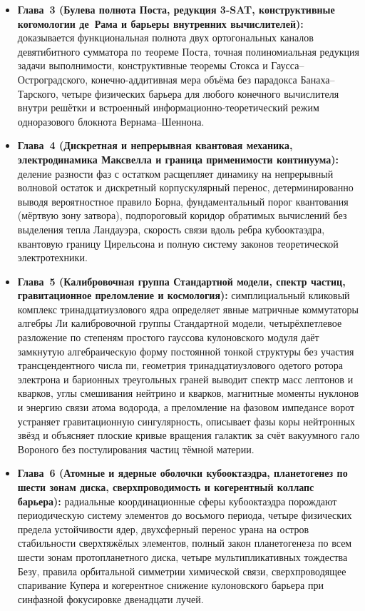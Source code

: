 \begin{itemize}[leftmargin=*,noitemsep]
\item \textbf{Глава~3 (Булева полнота Поста, редукция 3-SAT, конструктивные когомологии де~Рама и барьеры внутренних вычислителей):} доказывается функциональная полнота двух ортогональных каналов девятибитного сумматора по теореме Поста, точная полиномиальная редукция задачи выполнимости, конструктивные теоремы Стокса и Гаусса--Остроградского, конечно-аддитивная мера объёма без парадокса Банаха--Тарского, четыре физических барьера для любого конечного вычислителя внутри решётки и встроенный информационно-теоретический режим одноразового блокнота Вернама--Шеннона.
\item \textbf{Глава~4 (Дискретная и непрерывная квантовая механика, электродинамика Максвелла и граница применимости континуума):} деление разности фаз с остатком расщепляет динамику на непрерывный волновой остаток и дискретный корпускулярный перенос, детерминированно выводя вероятностное правило Борна, фундаментальный порог квантования (мёртвую зону затвора), подпороговый коридор обратимых вычислений без выделения тепла Ландауэра, скорость связи вдоль ребра кубооктаэдра, квантовую границу Цирельсона и полную систему законов теоретической электротехники.
\item \textbf{Глава~5 (Калибровочная группа Стандартной модели, спектр частиц, гравитационное преломление и космология):} симплициальный кликовый комплекс тринадцатиузлового ядра определяет явные матричные коммутаторы алгебры Ли калибровочной группы Стандартной модели, четырёхпетлевое разложение по степеням простого гауссова кулоновского модуля даёт замкнутую алгебраическую форму постоянной тонкой структуры без участия трансцендентного числа пи, геометрия тринадцатиузлового одетого ротора электрона и барионных треугольных граней выводит спектр масс лептонов и кварков, углы смешивания нейтрино и кварков, магнитные моменты нуклонов и энергию связи атома водорода, а преломление на фазовом импедансе ворот устраняет гравитационную сингулярность, описывает фазы коры нейтронных звёзд и объясняет плоские кривые вращения галактик за счёт вакуумного гало Вороного без постулирования частиц тёмной материи.
\item \textbf{Глава~6 (Атомные и ядерные оболочки кубооктаэдра, планетогенез по шести зонам диска, сверхпроводимость и когерентный коллапс барьера):} радиальные координационные сферы кубооктаэдра порождают периодическую систему элементов до восьмого периода, четыре физических предела устойчивости ядер, двухсферный перенос урана на остров стабильности сверхтяжёлых элементов, полный закон планетогенеза по всем шести зонам протопланетного диска, четыре мультипликативных тождества Безу, правила орбитальной симметрии химической связи, сверхпроводящее спаривание Купера и когерентное снижение кулоновского барьера при синфазной фокусировке двенадцати лучей.

\end{itemize}
